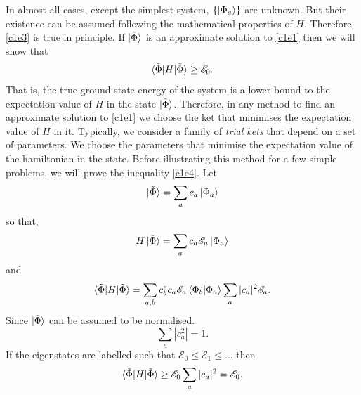 In almost all cases, except the simplest system, $\{\ket{\Phi_a}\}$ are unknown.
But their existence can be assumed following the mathematical properties of
$H$. Therefore, \ref{c1e3} is true in principle. If $\ket{\tilde{\Phi}}$
is an approximate solution to \eqref{c1e1} then we will show that
\begin{equation}\label{c1e4}
\braket{\tilde{\Phi}|H|\tilde{\Phi}} \ge \mathscr{E}_0.
\end{equation}
That is, the true ground state energy of the system is a lower bound to the
expectation value of $H$ in the state $\ket{\tilde{\Phi}}$. Therefore, in
any method to find an approximate solution to \eqref{c1e1} we choose the ket
that minimises the expectation value of $H$ in it. Typically, we consider
a family of \emph{trial kets} that depend on a set of parameters. We choose the
parameters that minimise the expectation value of the hamiltonian in the state.
Before illustrating this method for a few simple problems, we will prove the
inequality \eqref{c1e4}. Let
\begin{equation}\label{c1e5}
\ket{\tilde{\Phi}} = \sum_a c_a\ket{\Phi_a}
\end{equation}
so that,
\[
H\ket{\tilde{\Phi}} = \sum_a c_a\mathscr{E}_a\ket{\Phi_a}
\]
and
\begin{equation}\label{c1e6}
\braket{\tilde{\Phi}|H|\tilde{\Phi}} = \sum_{a,b}c_b^\ast c_a\mathscr{E}_a
\braket{\Phi_b|\Phi_a} \sum_a |c_a|^2\mathscr{E}_a.
\end{equation}
Since $\ket{\tilde{\Phi}}$ can be assumed to be normalised. 
\[
\sum_a |c_a^2| = 1.
\]
If the eigenstates are labelled such that $\mathscr{E}_0 \le \mathscr{E}_1 \le
\ldots$ then
\[
\braket{\tilde{\Phi}|H|\tilde{\Phi}} \ge \mathscr{E}_0\sum_a|c_a|^2 =
\mathscr{E}_0.
\]

